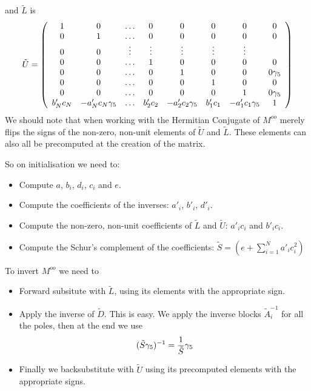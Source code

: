 \documentclass[12pt]{article}
\begin{document}
and $\tilde{L}$ is 
\begin{equation}
\tilde{U} = \left( \begin{array}{cccccccc} 
1 & 0 & \ldots & 0 & 0 & 0 & 0 & 0  \\
0 & 1 & \ldots & 0 & 0 & 0 & 0 &  0 \\
0 & 0 & \vdots & \vdots & \vdots & \vdots & \vdots \\
0 & 0 & \ldots & 1 & 0 & 0 & 0 &  0 \\
0 & 0 & \ldots & 0 & 1 & 0 & 0 &  0 \gamma_5 \\
0 & 0 & \ldots & 0 & 0 & 1 & 0 &  0 \\
0 & 0 & \ldots & 0 & 0 & 0 & 1 &  0 \gamma_5 \\
b'_N c_N & -a'_N c_N \gamma_5 & \ldots & b'_2 c_2 & -a'_2 c_2 \gamma_5  & b'_1 c_1 & -a'_1 c_1 \gamma_5 &     1
\end{array} \right)
\end{equation}
We should note that when working with the Hermitian Conjugate of 
$M^{oo}$ merely flips the signs of the non-zero, non-unit 
elements of $\tilde{U}$ and $\tilde{L}$. These elements 
can also all be precomputed at the creation of the matrix.

So on initialisation we need to:
\begin{itemize}
\item
Compute $a$, $b_i$, $d_i$, $c_i$ and $e$.
\item
Compute the coefficients of the inverses: $a'_i$, $b'_i$, $d'_i$.
\item
Compute the non-zero, non-unit coefficients of $\tilde{L}$ and $\tilde{U}$: $a'_i c_i$ and $b'_i c_i$.
\item
Compute the Schur's complement of the coefficients: $\tilde{S} = \left( e + \sum_{i=1}^{N} a'_i c^{2}_i \right)$
\end{itemize}

To invert $M^{oo}$ we need to 
\begin{itemize}
\item
Forward subsitute with $\tilde{L}$, using its elements with the appropriate
sign.
\item
Apply the inverse of $\tilde{D}$. This is easy. We apply the inverse blocks
$\tilde{A}^{-1}_i$ for all the poles, then at the end we use
\begin{equation}
(\tilde{S}\gamma_5)^{-1} = \frac{1}{\tilde{S}} \gamma_5
\end{equation}
\item
Finally we backsubstitute with $\tilde{U}$ using its precomputed
elements with the appropriate signs.
\end{itemize}
\end{document}
